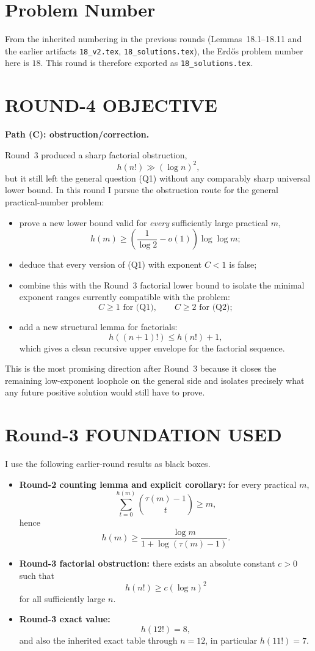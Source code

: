 \section{Problem Number}

From the inherited numbering in the previous rounds (Lemmas~18.1--18.11 and the earlier artifacts \texttt{18\_v2.tex}, \texttt{18\_solutions.tex}), the Erd\H{o}s problem number here is \(18\). This round is therefore exported as \texttt{18\_solutions.tex}.

\section{ROUND-4 OBJECTIVE}

\textbf{Path (C): obstruction/correction.}

Round~3 produced a sharp factorial obstruction,
\[
h(n!) \gg (\log n)^2,
\]
but it still left the general question (Q1) without any comparably sharp universal lower bound. In this round I pursue the obstruction route for the general practical-number problem:

\begin{itemize}
\item prove a new lower bound valid for \emph{every} sufficiently large practical \(m\),
\[
h(m)\ge \left(\frac1{\log 2}-o(1)\right)\log\log m;
\]
\item deduce that every version of (Q1) with exponent \(C<1\) is false;
\item combine this with the Round~3 factorial lower bound to isolate the minimal exponent ranges currently compatible with the problem:
\[
C\ge 1 \text{ for (Q1)},\qquad C\ge 2 \text{ for (Q2)};
\]
\item add a new structural lemma for factorials:
\[
h((n+1)!)\le h(n!)+1,
\]
which gives a clean recursive upper envelope for the factorial sequence.
\end{itemize}

This is the most promising direction after Round~3 because it closes the remaining low-exponent loophole on the general side and isolates precisely what any future positive solution would still have to prove.

\section{Round-3 FOUNDATION USED}

I use the following earlier-round results as black boxes.

\begin{itemize}
\item \textbf{Round-2 counting lemma and explicit corollary:} for every practical \(m\),
\[
\sum_{t=0}^{h(m)} \binom{\tau(m)-1}{t}\ge m,
\]
hence
\[
h(m)\ge \frac{\log m}{1+\log(\tau(m)-1)}.
\]
\item \textbf{Round-3 factorial obstruction:} there exists an absolute constant \(c>0\) such that
\[
h(n!)\ge c(\log n)^2
\]
for all sufficiently large \(n\).
\item \textbf{Round-3 exact value:}
\[
h(12!)=8,
\]
and also the inherited exact table through \(n=12\), in particular \(h(11!)=7\).
\end{itemize}

